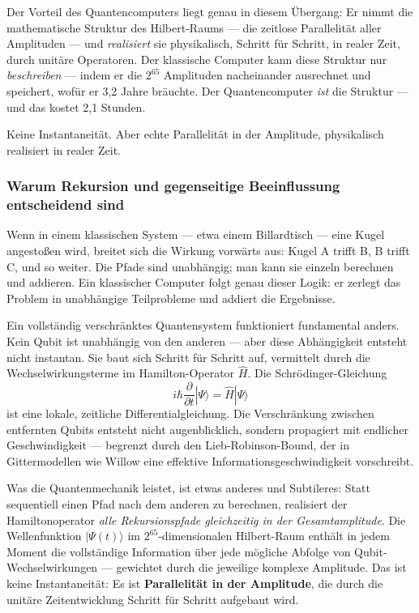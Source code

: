Der Vorteil des Quantencomputers liegt genau in diesem Übergang: Er nimmt
die mathematische Struktur des Hilbert-Raums — die zeitlose Parallelität aller
Amplituden — und \emph{realisiert} sie physikalisch, Schritt für Schritt, in
realer Zeit, durch unitäre Operatoren. Der klassische Computer kann diese
Struktur nur \emph{beschreiben} — indem er die $2^{65}$ Amplituden nacheinander
ausrechnet und speichert, wofür er 3,2 Jahre bräuchte. Der Quantencomputer
\emph{ist} die Struktur — und das kostet 2,1 Stunden.

Keine Instantaneität. Aber echte Parallelität in der Amplitude, physikalisch
realisiert in realer Zeit.

\subsubsection*{Warum Rekursion und gegenseitige Beeinflussung entscheidend sind}

Wenn in einem klassischen System — etwa einem Billardtisch — eine Kugel angestoßen
wird, breitet sich die Wirkung vorwärts aus: Kugel A trifft B, B trifft C, und so
weiter. Die Pfade sind unabhängig; man kann sie einzeln berechnen und addieren. Ein
klassischer Computer folgt genau dieser Logik: er zerlegt das Problem in unabhängige
Teilprobleme und addiert die Ergebnisse.

Ein vollständig verschränktes Quantensystem funktioniert fundamental anders.
Kein Qubit ist unabhängig von den anderen — aber diese Abhängigkeit entsteht
nicht instantan. Sie baut sich Schritt für Schritt auf, vermittelt durch die
Wechselwirkungsterme im Hamilton-Operator $\hat{H}$. Die Schrödinger-Gleichung
\begin{equation}
    i\hbar \frac{\partial}{\partial t}|\Psi\rangle = \hat{H}|\Psi\rangle
\end{equation}
ist eine lokale, zeitliche Differentialgleichung. Die Verschränkung zwischen
entfernten Qubits entsteht nicht augenblicklich, sondern propagiert mit endlicher
Geschwindigkeit — begrenzt durch den Lieb-Robinson-Bound, der in Gittermodellen
wie Willow eine effektive Informationsgeschwindigkeit vorschreibt.

Was die Quantenmechanik leistet, ist etwas anderes und Subtileres: Statt
sequentiell einen Pfad nach dem anderen zu berechnen, realisiert der Hamiltonoperator
\emph{alle Rekursionspfade gleichzeitig in der Gesamtamplitude}. Die
Wellenfunktion $|\Psi(t)\rangle$ im $2^{65}$-dimensionalen Hilbert-Raum enthält
in jedem Moment die vollständige Information über jede mögliche Abfolge von
Qubit-Wechselwirkungen — gewichtet durch die jeweilige komplexe Amplitude.
Das ist keine Instantaneität: Es ist \textbf{Parallelität in der Amplitude},
die durch die unitäre Zeitentwicklung Schritt für Schritt aufgebaut wird.

